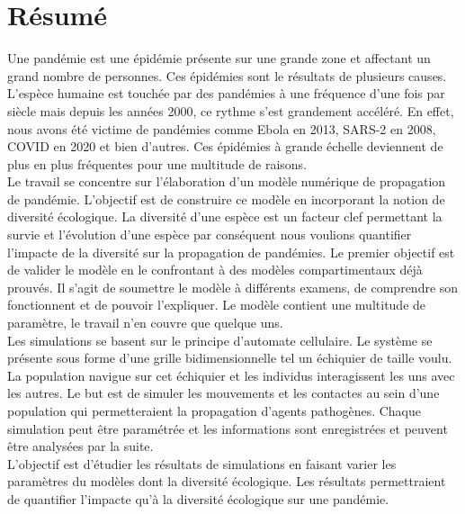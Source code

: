 \chapter{Résumé} \label{ch:resume}

Une pandémie est une épidémie présente sur une grande zone et affectant un grand nombre de personnes. Ces épidémies sont le résultats de plusieurs causes. L'espèce humaine est touchée par des pandémies à une fréquence d'une fois par siècle mais depuis les années 2000, ce rythme s'est grandement accéléré. En effet, nous avons été victime de pandémies comme Ebola en 2013, SARS-2 en 2008, COVID en 2020 et bien d'autres. Ces épidémies à grande échelle deviennent de plus en plus fréquentes pour une multitude de raisons.\\

Le travail se concentre sur l'élaboration d'un modèle numérique de propagation de pandémie. L'objectif est de construire ce modèle en incorporant la notion de diversité écologique. La diversité d'une espèce est un facteur clef permettant la survie et l'évolution d'une espèce par conséquent nous voulions quantifier l'impacte de la diversité sur la propagation de pandémies. Le premier objectif est de valider le modèle en le confrontant à des modèles compartimentaux déjà prouvés. Il s'agit de soumettre le modèle à différents examens, de comprendre son fonctionnent et de pouvoir l'expliquer. Le modèle contient une multitude de paramètre, le travail n'en couvre que quelque uns.\\

Les simulations se basent sur le principe d'automate cellulaire. Le système se présente sous forme d'une grille bidimensionnelle tel un échiquier de taille voulu. La population navigue sur cet échiquier et les individus interagissent les uns avec les autres. Le but est de simuler les mouvements et les contactes au sein d'une population qui permetteraient la propagation d'agents pathogènes. Chaque simulation peut être paramétrée et les informations sont enregistrées et peuvent être analysées par la suite.\\

L'objectif est d'étudier les résultats de simulations en faisant varier les paramètres du modèles dont la diversité écologique. Les résultats permettraient de quantifier l'impacte qu'à la diversité écologique sur une pandémie.
